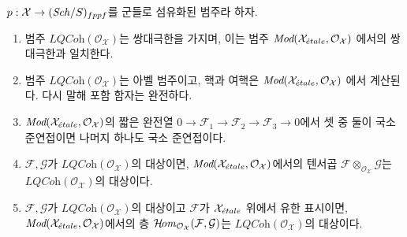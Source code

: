 \begin{lemma}
\label{lemma-lqc-colimits}
$p : \mathcal{X} \to (\mathit{Sch}/S)_{fppf}$를 군들로 섬유화된 범주라 하자.
\begin{enumerate}
\item 범주 $\textit{LQCoh}(\mathcal{O}_\mathcal{X})$는 쌍대극한을 가지며,
이는 범주
$\textit{Mod}(\mathcal{X}_{\acute{e}tale}, \mathcal{O}_\mathcal{X})$
에서의 쌍대극한과 일치한다.
\item 범주 $\textit{LQCoh}(\mathcal{O}_\mathcal{X})$는 아벨 범주이고,
핵과 여핵은
$\textit{Mod}(\mathcal{X}_{\acute{e}tale}, \mathcal{O}_\mathcal{X})$
에서 계산된다. 다시 말해 포함 함자는 완전하다.
\item $\textit{Mod}(\mathcal{X}_{\acute{e}tale}, \mathcal{O}_\mathcal{X})$의
짧은 완전열
$0 \to \mathcal{F}_1 \to \mathcal{F}_2 \to \mathcal{F}_3 \to 0$에서
셋 중 둘이 국소 준연접이면 나머지 하나도 국소 준연접이다.
\item $\mathcal{F}, \mathcal{G}$가
$\textit{LQCoh}(\mathcal{O}_\mathcal{X})$의 대상이면,
$\textit{Mod}(\mathcal{X}_{\acute{e}tale}, \mathcal{O}_\mathcal{X})$에서의 텐서곱
$\mathcal{F} \otimes_{\mathcal{O}_\mathcal{X}} \mathcal{G}$는
$\textit{LQCoh}(\mathcal{O}_\mathcal{X})$의 대상이다.
\item $\mathcal{F}, \mathcal{G}$가
$\textit{LQCoh}(\mathcal{O}_\mathcal{X})$의 대상이고
$\mathcal{F}$가 $\mathcal{X}_{\acute{e}tale}$ 위에서 유한 표시이면,
$\textit{Mod}(\mathcal{X}_{\acute{e}tale}, \mathcal{O}_\mathcal{X})$에서의 층
$\mathop{\mathcal{H}\!\mathit{om}}\nolimits_{\mathcal{O}_\mathcal{X}}(\mathcal{F}, \mathcal{G})$는
$\textit{LQCoh}(\mathcal{O}_\mathcal{X})$의 대상이다.
\end{enumerate}
\end{lemma}

